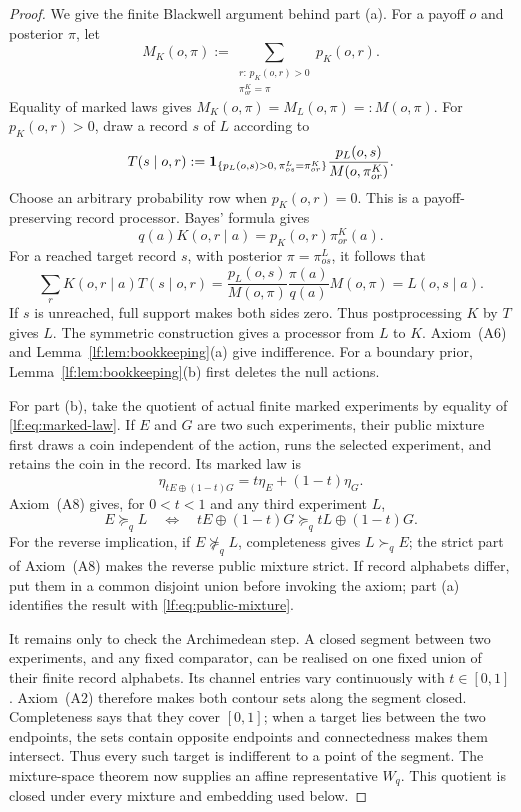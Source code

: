 \begin{proof}
We give the finite Blackwell argument behind part \textup{(a)}.  For a payoff
$o$ and posterior $\pi$, let
\[
M_K(o,\pi):=
\sum_{\substack{r:\,p_K(o,r)>0\\ \pi^K_{or}=\pi}} p_K(o,r).
\]
Equality of marked laws gives $M_K(o,\pi)=M_L(o,\pi)=:M(o,\pi)$.
For $p_K(o,r)>0$, draw a record $s$ of $L$ according to
\begin{equation}
T(s\mid o,r):=
\mathbf 1_{\{p_L(o,s)>0,\,\pi^L_{os}=\pi^K_{or}\}}
\frac{p_L(o,s)}{M(o,\pi^K_{or})}.
\label{lf:eq:matching-processor}
\end{equation}
Choose an arbitrary probability row when $p_K(o,r)=0$.  This is a
payoff-preserving record processor.  Bayes' formula gives
\[
q(a)K(o,r\mid a)=p_K(o,r)\pi^K_{or}(a).
\]
For a reached target record $s$, with posterior $\pi=\pi^L_{os}$, it follows
that
\[
\sum_r K(o,r\mid a)T(s\mid o,r)
=\frac{p_L(o,s)}{M(o,\pi)}
  \frac{\pi(a)}{q(a)}M(o,\pi)
=L(o,s\mid a).
\]
If $s$ is unreached, full support makes both sides zero.  Thus postprocessing
$K$ by $T$ gives $L$.  The symmetric construction gives a
processor from $L$ to $K$.  Axiom~\textup{(A6)} and
Lemma~\ref{lf:lem:bookkeeping}\textup{(a)} give indifference.  For a boundary
prior, Lemma~\ref{lf:lem:bookkeeping}\textup{(b)} first deletes the null
actions.

For part \textup{(b)}, take the quotient of actual finite marked experiments by
equality of \eqref{lf:eq:marked-law}.  If $E$ and $G$ are two such experiments,
their public mixture first draws a coin independent of the action, runs the
selected experiment, and retains the coin in the record.  Its marked law is
\begin{equation}
\eta_{tE\oplus(1-t)G}=t\eta_E+(1-t)\eta_G.
\label{lf:eq:public-mixture}
\end{equation}
Axiom~\textup{(A8)} gives, for $0<t<1$ and any third experiment $L$,
\begin{equation}
E\succeq_q L
\quad\Longleftrightarrow\quad
tE\oplus(1-t)G\succeq_q tL\oplus(1-t)G.
\label{lf:eq:mixture-independence}
\end{equation}
For the reverse implication, if $E\not\succeq_q L$, completeness gives
$L\succ_q E$; the strict part of Axiom~\textup{(A8)} makes the reverse public
mixture strict.  If record
alphabets differ, put them in a common disjoint union before invoking the
axiom; part \textup{(a)} identifies the result with
\eqref{lf:eq:public-mixture}.

It remains only to check the Archimedean step.  A closed segment between two
experiments, and any fixed comparator, can be realised on one fixed union of
their finite record alphabets.  Its channel entries vary continuously with
$t\in[0,1]$.
Axiom~\textup{(A2)} therefore makes both contour sets along the segment closed.
Completeness says that they cover $[0,1]$; when a target lies between the two
endpoints, the sets contain opposite endpoints and connectedness makes them
intersect.  Thus every such target is indifferent to a point of the segment.
The mixture-space theorem now supplies an affine representative $W_q$.  This
quotient is closed under every mixture and embedding used below.
\end{proof}

